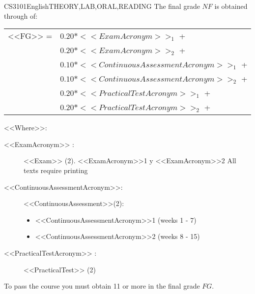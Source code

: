   \begin{evaluation}{CS3101}{English}{THEORY,LAB,ORAL,READING}
  The final grade $NF$ is obtained through of:\\
 
  \begin{tabular}{cl}
    <<FG>> =  & $0.20*<<ExamAcronym>>_{1}$ +\\
              & $0.20*<<ExamAcronym>>_{2}$ +\\
              & $0.10*<<ContinuousAssessmentAcronym>>_{1}$ +  \\
              & $0.10*<<ContinuousAssessmentAcronym>>_{2}$ + \\
              & $0.20*<<PracticalTestAcronym>>_{1}$ +\\
              & $0.20*<<PracticalTestAcronym>>_{2}$ +\\
  \end{tabular}

  \noindent <<Where>>:
  \begin{description}
         \item[<<ExamAcronym>> :] <<Exam>> (2). <<ExamAcronym>>1 y <<ExamAcronym>>2  All texts require printing
         \item[<<ContinuousAssessmentAcronym>>:]<<ContinuousAssessment>>(2):
             \begin{itemize}
                \item <<ContinuousAssessmentAcronym>>1 (weeks 1 - 7) 
                 \item <<ContinuousAssessmentAcronym>>2 (weeks 8 - 15)
             \end{itemize}
    \item[<<PracticalTestAcronym>> :] <<PracticalTest>> (2)
  \end{description}
   \noindent To pass the course you must obtain 11 or more in the final grade $FG$.
  \end{evaluation}



